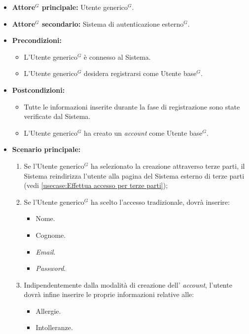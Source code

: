 \label{usecase:Effettua registrazione \gls{Utente base}$^G$}
\begin{itemize}

	\item \textbf{\gls{Attore}$^G$ principale:} \gls{Utente generico}$^G$.
	\item \textbf{\gls{Attore}$^G$ secondario:} Sistema di autenticazione esterno$^G$.

	\item \textbf{Precondizioni:} 
	\begin{itemize}
        \item  L'\gls{Utente generico}$^G$ è connesso al Sistema.
        \item  L'\gls{Utente generico}$^G$ desidera registrarsi come \gls{Utente base}$^G$.
    \end{itemize}
    
	\item \textbf{Postcondizioni:} 
    \begin{itemize}
        \item  Tutte le informazioni inserite durante la fase di registrazione sono state verificate dal Sistema.
        \item  L'\gls{Utente generico}$^G$ ha creato un \textit{account} come \gls{Utente base}$^G$.
    \end{itemize}

	\item \textbf{Scenario principale:}
	\begin{enumerate}

            \item Se l'\gls{Utente generico}$^G$ ha selezionato la creazione attraverso terze parti, il Sistema reindirizza l'utente alla pagina del Sistema esterno di terze parti (vedi \autoref{usecase:Effettua accesso per terze parti});
            \item Se l'\gls{Utente generico}$^G$ ha scelto l'accesso tradizionale, dovrà inserire:
            \begin{itemize}
                \item Nome.
                \item Cognome.
                \item \textit{Email}.
                \item \textit{Password}.
            \end{itemize}
            \item Indipendentemente dalla modalità di creazione dell' \textit{account}, l'utente dovrà infine inserire le proprie informazioni relative alle:
            \begin{itemize}
                \item Allergie.
                \item Intolleranze.
            \end{itemize} 
	\end{enumerate}
\end{itemize}